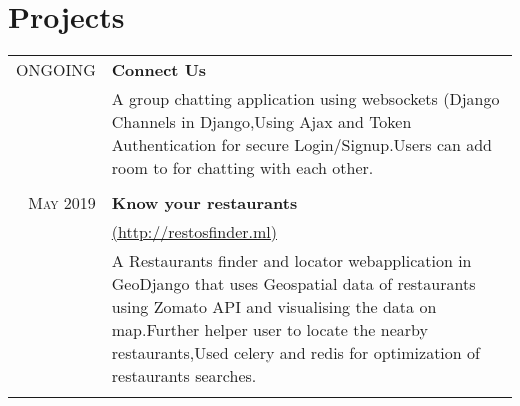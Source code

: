 \documentclass[a4paper,1pt]{article}
\begin{document}
\section{Projects}
\begin{tabular}{r|p{11cm}}
\textsc{ONGOING} & \textbf{Connect Us}\\&\footnotesize{A group chatting application using websockets (Django Channels in Django,Using Ajax and Token Authentication for secure Login/Signup.Users can add room to for chatting with each other.}\\\multicolumn{2}{c}{}\\

\textsc{May 2019} & \textbf{Know your restaurants}\\&\href{http://restosfinder.ml}{(http://restosfinder.ml)}\\&\footnotesize{A Restaurants finder and locator webapplication in GeoDjango that uses Geospatial data of restaurants using Zomato API and visualising the data on map.Further helper user to locate the nearby restaurants,Used celery and redis for optimization of restaurants searches.}\\\multicolumn{2}{c}{} \\


\end{tabular}
\end{document}
